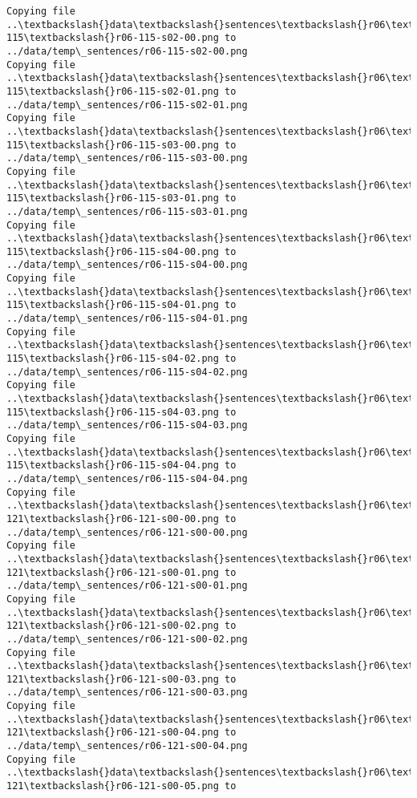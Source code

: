 \documentclass[11pt]{article}
\begin{document}
\begin{Verbatim}[commandchars=\\\{\}]
Copying file ..\textbackslash{}data\textbackslash{}sentences\textbackslash{}r06\textbackslash{}r06-115\textbackslash{}r06-115-s02-00.png to
../data/temp\_sentences/r06-115-s02-00.png
Copying file ..\textbackslash{}data\textbackslash{}sentences\textbackslash{}r06\textbackslash{}r06-115\textbackslash{}r06-115-s02-01.png to
../data/temp\_sentences/r06-115-s02-01.png
Copying file ..\textbackslash{}data\textbackslash{}sentences\textbackslash{}r06\textbackslash{}r06-115\textbackslash{}r06-115-s03-00.png to
../data/temp\_sentences/r06-115-s03-00.png
Copying file ..\textbackslash{}data\textbackslash{}sentences\textbackslash{}r06\textbackslash{}r06-115\textbackslash{}r06-115-s03-01.png to
../data/temp\_sentences/r06-115-s03-01.png
Copying file ..\textbackslash{}data\textbackslash{}sentences\textbackslash{}r06\textbackslash{}r06-115\textbackslash{}r06-115-s04-00.png to
../data/temp\_sentences/r06-115-s04-00.png
Copying file ..\textbackslash{}data\textbackslash{}sentences\textbackslash{}r06\textbackslash{}r06-115\textbackslash{}r06-115-s04-01.png to
../data/temp\_sentences/r06-115-s04-01.png
Copying file ..\textbackslash{}data\textbackslash{}sentences\textbackslash{}r06\textbackslash{}r06-115\textbackslash{}r06-115-s04-02.png to
../data/temp\_sentences/r06-115-s04-02.png
Copying file ..\textbackslash{}data\textbackslash{}sentences\textbackslash{}r06\textbackslash{}r06-115\textbackslash{}r06-115-s04-03.png to
../data/temp\_sentences/r06-115-s04-03.png
Copying file ..\textbackslash{}data\textbackslash{}sentences\textbackslash{}r06\textbackslash{}r06-115\textbackslash{}r06-115-s04-04.png to
../data/temp\_sentences/r06-115-s04-04.png
Copying file ..\textbackslash{}data\textbackslash{}sentences\textbackslash{}r06\textbackslash{}r06-121\textbackslash{}r06-121-s00-00.png to
../data/temp\_sentences/r06-121-s00-00.png
Copying file ..\textbackslash{}data\textbackslash{}sentences\textbackslash{}r06\textbackslash{}r06-121\textbackslash{}r06-121-s00-01.png to
../data/temp\_sentences/r06-121-s00-01.png
Copying file ..\textbackslash{}data\textbackslash{}sentences\textbackslash{}r06\textbackslash{}r06-121\textbackslash{}r06-121-s00-02.png to
../data/temp\_sentences/r06-121-s00-02.png
Copying file ..\textbackslash{}data\textbackslash{}sentences\textbackslash{}r06\textbackslash{}r06-121\textbackslash{}r06-121-s00-03.png to
../data/temp\_sentences/r06-121-s00-03.png
Copying file ..\textbackslash{}data\textbackslash{}sentences\textbackslash{}r06\textbackslash{}r06-121\textbackslash{}r06-121-s00-04.png to
../data/temp\_sentences/r06-121-s00-04.png
Copying file ..\textbackslash{}data\textbackslash{}sentences\textbackslash{}r06\textbackslash{}r06-121\textbackslash{}r06-121-s00-05.png to

\end{Verbatim}
\end{document}
